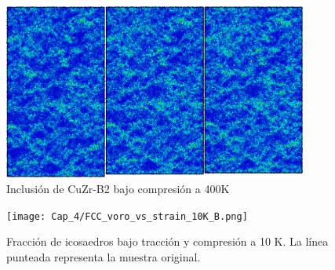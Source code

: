 \begin{figure}[htp]
\centering
\includegraphics[width=10cm]{../ResumenImagenes/Figures/NanoParticles/Snapshots/B2SphereCompression_400K_Snapshots.png}
\caption[Inclusión de CuZr-B2 bajo compresión a 400K]{Inclusión de CuZr-B2 bajo compresión a 400K}
\label{C4:fg:snapshot_comp_B2_400K}
\end{figure}

\begin{figure}[htp]
\centering
\texttt{[image: Cap\_4/FCC\_voro\_vs\_strain\_10K\_B.png]}
\caption[Fracción de icosaedros a 10K]{Fracción de icosaedros bajo tracción y compresión a 10 K. La línea punteada representa la muestra original.}
\label{C4:fg:fcc_voro_10K}
\end{figure}

% 
% 
% 
